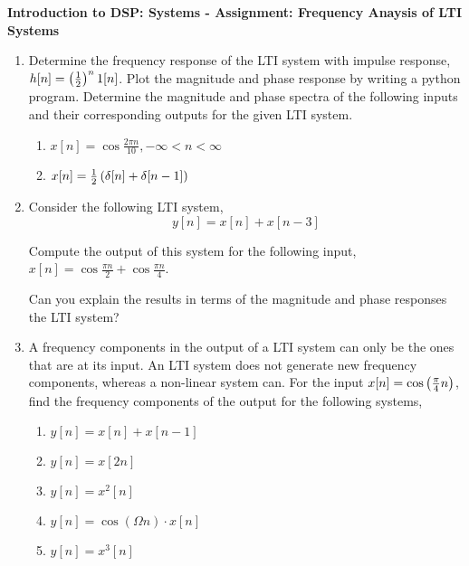 \documentclass[9pt]{article}
\def\lp{\ensuremath\left(}
\def\rp{\ensuremath\right)}
\begin{document}
\begin{center}
    \begin{Large}
        \textbf{Introduction to DSP: Systems - Assignment: Frequency Anaysis of LTI Systems}
    \end{Large}
\end{center}
\vspace{0.2cm}

\begin{multicols}{2}
    \begin{enumerate}
        \item Determine the frequency response of the LTI system with impulse response, $h[n] = \lp \frac{1}{2} \rp^n 1[n]$. Plot the magnitude and phase response by writing a python program. Determine the magnitude and phase spectra of the following inputs and their corresponding outputs for the given LTI system.
        \begin{enumerate}
            \item $x[n] = \cos \frac{2 \pi n}{10}, -\infty < n < \infty$
            \item $x[n] = \frac{1}{2} \lp \delta[n] + \delta[n-1] \rp$
        \end{enumerate}

        \item Consider the following LTI system,
        \[ y[n] = x[n] + x[n-3] \]

        Compute the output of this system for the following input, $x[n] = \cos \frac{\pi n}{2} + \cos \frac{\pi n}{4}$.

        Can you explain the results in terms of the magnitude and phase responses the LTI system?

        \item A frequency components in the output of a LTI system can only be the ones that are at its input. An LTI system does not generate new frequency components, whereas a non-linear system can. For the input $x[n] = \cos \lp \frac{\pi}{4}n \rp$, find the frequency components of the output for the following systems,
        \begin{enumerate}
             \item $y[n] = x[n] + x[n-1]$
             \item $y[n] = x[2n]$
             \item $y[n] = x^2[n]$
             \item $y[n] = \cos(\Omega n) \cdot x[n]$
             \item $y[n] = x^3[n]$
         \end{enumerate} 


\end{enumerate}
\end{multicols}
\end{document}
